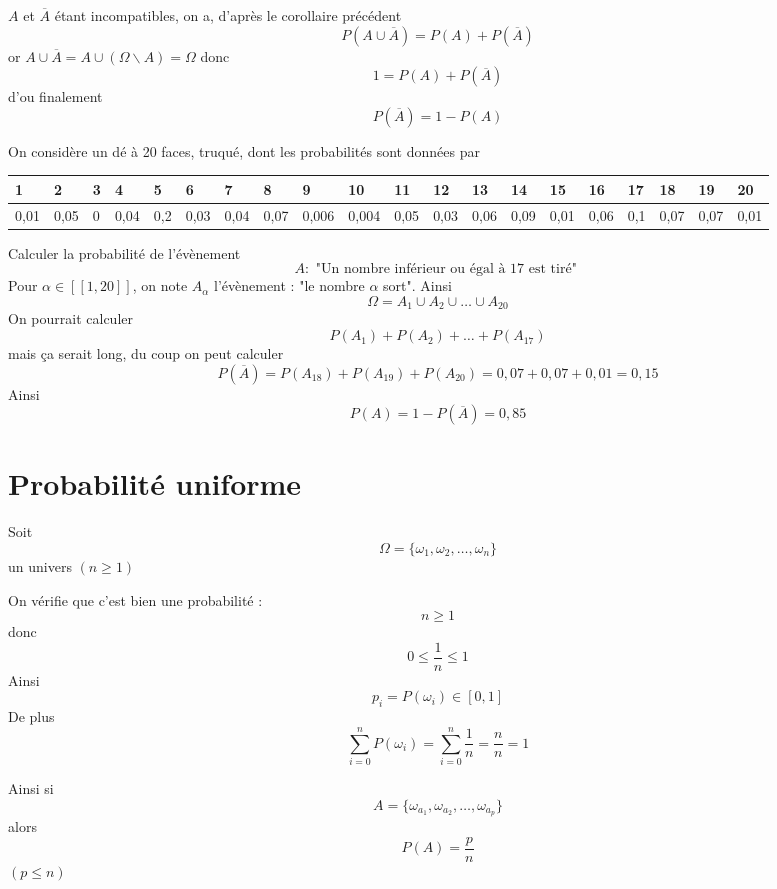 \begin{preuve}
$A$ et $\overline{A}$ étant incompatibles, on a, d'après le corollaire précédent $$P(A\cup \overline{A}) = P(A) + P(\overline{A})$$ or $A\cup \overline{A} = A \cup (\Omega \backslash A) = \Omega$ donc $$1 = P(A) + P(\overline{A})$$ d'ou finalement 
$$P(\overline{A}) = 1 - P(A)$$
\end{preuve}
\begin{exemple}
On considère un dé à 20 faces, truqué, dont les probabilités sont données par \newline


\begin{tabularx}{\linewidth}{| X | X | X | X | X | X | X | X | X | X | X | X | X | X | X | X | X | X | X | X |}
\hline
1 & 2 & 3 & 4 & 5 & 6 & 7 & 8 & 9 & 10 & 11 & 12 & 13 & 14 & 15 & 16 & 17 & 18 & 19 & 20\\ \hline
0,01 & 0,05 & 0 & 0,04 & 0,2 & 0,03 & 0,04 & 0,07 & 0,006 & 0,004 & 0,05 & 0,03 & 0,06 & 0,09 & 0,01 & 0,06 & 0,1 & 0,07 & 0,07 & 0,01\\ \hline
\end{tabularx}
Calculer la probabilité de l'évènement 
$$A : \text{ "Un nombre inférieur ou égal à 17 est tiré" }$$
Pour $\alpha \in [\![1,20]\!]$, on note $A_\alpha$ l'évènement : "le nombre $\alpha$ sort". Ainsi 
$$\Omega = A_1 \cup A_2 \cup \ldots \cup A_{20}$$
On pourrait calculer 
$$P(A_1) + P(A_2) + \ldots + P(A_{17})$$ 
mais ça serait long, du coup on peut calculer 
$$P(\overline{A}) = P(A_{18}) + P(A_{19}) + P(A_{20}) = 0,07 + 0,07 + 0,01 = 0,15$$
Ainsi 
$$P(A) = 1 - P(\overline{A}) = 0,85$$
\end{exemple}
\section{Probabilité uniforme}
Soit $$\Omega = \{\omega_1,\omega_2,\ldots,\omega_n\}$$
un univers $(n\geq 1)$\newline

\newline

\begin{preuve}
On vérifie que c'est bien une probabilité : 
$$n\geq 1$$
donc 
$$0 \leq \dfrac{1}{n} \leq 1$$
Ainsi $$p_i = P(\omega_i) \in [0,1]$$
De plus 
$$\sum_{i=0}^n P(\omega_i) = \sum_{i=0}^n \dfrac{1}{n} = \dfrac{n}{n} =1$$ 
\end{preuve}
Ainsi si $$A = \{\omega_{a_1},\omega_{a_2},\ldots,\omega_{a_p}\}$$
alors $$P(A) = \dfrac{p}{n}$$
$(p \leq n)$\newline

